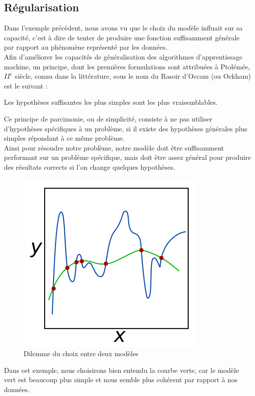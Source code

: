 \documentclass[10pt,a4paper]{report}
\begin{document}
		\subsection{Régularisation}
			Dans l'exemple précédent, nous avons vu que le choix du modèle influait sur sa capacité, c'est à dire de tenter de produire une fonction suffisamment générale par rapport au phénomène représenté par les données.\\
	Afin d'améliorer les capacités de généralisation des algorithmes d'apprentissage machine, un principe, dont les premières formulations sont attribuées à Ptolémée, $II^e$ siècle, connu dans la littérature, sous le nom du Rasoir d'Occam (ou Ockham) est le suivant : 
	\begin{displayquote}
		Les hypothèses suffisantes les plus simples sont les plus vraisemblables.
	\end{displayquote}
	Ce principe de parcimonie, ou de simplicité, consiste à ne pas utiliser d'hypothèses spécifiques à un problème, si il existe des hypothèses générales plus simples répondant à ce même problème.\\
	Ainsi pour résoudre notre problème, notre modèle doit être suffisamment performant sur un problème spécifique, mais doit être assez général pour produire des résultats corrects si l'on change quelques hypothèses.\\
	\begin{figure}[H]
		\begin{center}
			\includegraphics[scale=0.5]{Images/regularization.png}
			\caption{Dilemme du choix entre deux modèles}
		\end{center}
	\end{figure}
	Dans cet exemple, nous choisirons bien entendu la courbe verte, car le modèle vert est beaucoup plus simple et nous semble plus cohérent par rapport à nos données.\\
\end{document}
